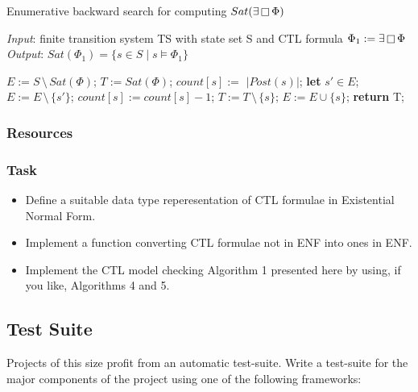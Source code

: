 \documentclass{article}
\begin{document}
\begin{algorithm}[H]
    \caption{Enumerative backward search for computing $Sat(\exists \mathop{\Box} \Phi)$}
    \hspace*{\algorithmicindent} \emph{Input}: finite transition system TS with state set S and CTL formula $\Phi_1 := \exists \mathop{\Box} \Phi$ \\
    \hspace*{\algorithmicindent} \emph{Output}: $Sat(\Phi_1) = \{ s \in S \mid s \vDash \Phi_1 \}$
    \begin{algorithmic}[1]
        \State $E := S \, \setminus \, Sat(\Phi)$;
        \State $T := Sat(\Phi)$;
            \State $count[s] := \, \, | Post(s) | $; 
        \EndFor 
            \State \textbf{let} $s' \in E$;
            \State $E := E \, \setminus \, \{ s' \}$;
                    \State $count[s] := count[s] -1$;
                        \State $T := T \, \setminus \, \{s\}$;
                        \State $E := E \cup \{s\}$;
                    \EndIf 
                \EndIf
            \EndFor
        \EndWhile
    \State \textbf{return} T;
    \end{algorithmic}
\end{algorithm}



\subsubsection{Resources}
\cite[Paragraph 6.4]{BaKa}

\color{red}
\subsubsection*{Task}
\begin{itemize}
    \item Define a suitable data type reperesentation of CTL formulae in Existential Normal Form.
    \item Implement a function converting CTL formulae not in ENF into ones in ENF.
    \item Implement the CTL model checking Algorithm 1 presented here by using, if you like, Algorithms 4 and 5.
\end{itemize}

\color{black}

\subsection{Test Suite}
\label{subsec-testsuite}
Projects of this size profit from an automatic test-suite. 
Write a test-suite for the major components of the project using one of the following frameworks:
\end{document}
